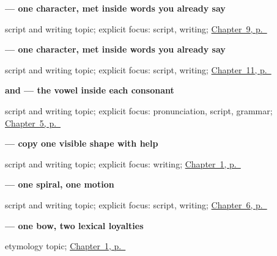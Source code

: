\noindent\begin{minipage}[t]{\linewidth}
\raggedright
\textbf{ — one character, met inside words you already say}\par
\footnotesize script and writing topic; explicit focus: script, writing; \hyperref[ch:ta-sorry]{Chapter~9, p.~\pageref*{ch:ta-sorry}}
\end{minipage}\par\smallskip

\noindent\begin{minipage}[t]{\linewidth}
\raggedright
\textbf{ — one character, met inside words you already say}\par
\footnotesize script and writing topic; explicit focus: script, writing; \hyperref[ch:ta-colours]{Chapter~11, p.~\pageref*{ch:ta-colours}}
\end{minipage}\par\smallskip

\noindent\begin{minipage}[t]{\linewidth}
\raggedright
\textbf{ and  — the vowel inside each consonant}\par
\footnotesize script and writing topic; explicit focus: pronunciation, script, grammar; \hyperref[ch:first-verbs]{Chapter~5, p.~\pageref*{ch:first-verbs}}
\end{minipage}\par\smallskip

\noindent\begin{minipage}[t]{\linewidth}
\raggedright
\textbf{ — copy one visible shape with help}\par
\footnotesize script and writing topic; explicit focus: writing; \hyperref[ch:greetings]{Chapter~1, p.~\pageref*{ch:greetings}}
\end{minipage}\par\smallskip

\noindent\begin{minipage}[t]{\linewidth}
\raggedright
\textbf{ — one spiral, one motion}\par
\footnotesize script and writing topic; explicit focus: script, writing; \hyperref[ch:ta-dative-case]{Chapter~6, p.~\pageref*{ch:ta-dative-case}}
\end{minipage}\par\smallskip

\noindent\begin{minipage}[t]{\linewidth}
\raggedright
\textbf{ — one bow, two lexical loyalties}\par
\footnotesize etymology topic; \hyperref[ch:greetings]{Chapter~1, p.~\pageref*{ch:greetings}}
\end{minipage}\par\smallskip

